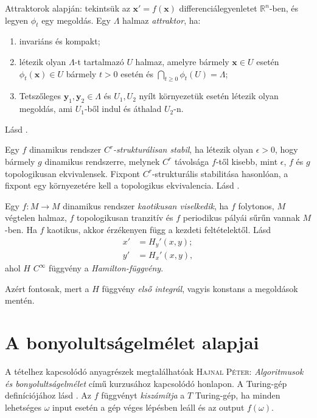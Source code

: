 \documentclass[%
	DIV=15,appendixprefix]{scrreprt}
\theoremstyle{definition}
\theoremstyle{remark}
\begin{document}
Attraktorok \cite[310.~oldal]{DE} alapján: tekintsük az $ \mathbf{ x }' = f \left( \mathbf{ x }
\right) $ differenciálegyenletet $ \mathbb{ R }^{ n } $-ben, és legyen $ \phi_{ t } $ egy megoldás.
Egy $ \Lambda $ halmaz \emph{attraktor}, ha:
\begin{enumerate}
	\item invariáns és kompakt;
	\item létezik olyan $ \Lambda$-t tartalmazó $U$ halmaz, amelyre bármely $ \mathbf{ x } \in
		U $ esetén $ \phi_{ t } \left( \mathbf{ x } \right) \in U $ bármely $ t > 0 $ esetén és
		$ \bigcap_{ t \ge 0 } \phi_{ t } \left( U \right) = \Lambda $;
	\item Tetszőleges $ \mathbf{ y }_{ 1 },{} \mathbf{ y }_{ 2 } \in \Lambda $ és $ U_{ 1 },{}
		U_{ 2 } $ nyílt környezetük esetén létezik olyan megoldás, ami $ U_{ 1 } $-ből indul és
		áthalad $ U_{ 2 } $-n.
\end{enumerate}
%
Lásd \cite[26.~oldal]{Makay}.

Egy $f$ dinamikus rendszer \emph{$C^r$-strukturálisan stabil}, ha létezik olyan $\epsilon >0$, hogy
bármely $g$ dinamikus rendszerre, melynek $C^r$ távolsága $f$-től kisebb, mint $\epsilon$, $f$ és
$g$ topologikusan ekvivalensek. Fixpont $C^r$-strukturális stabilitása hasonlóan, a fixpont egy
környezetére kell a topologikus ekvivalencia.
%
Lásd \cite[30.~oldal]{Makay}.

Egy $f \colon M \rightarrow M $ dinamikus rendszer \emph{kaotikusan viselkedik}, ha $f$ folytonos,
$M$ végtelen halmaz, $f$ topologikusan tranzitív és $f$ periodikus pályái sűrűn vannak $M$-ben. Ha
$f$ kaotikus, akkor érzékenyen függ a kezdeti feltételektől.
%
Lásd \cite[207.~oldal]{DE}
\begin{align*}
	x' &= H_{ y }'\left( x,{} y  \right);\\
	y' &= H_{ x }'\left( x,{} y  \right),
\end{align*}
ahol $H$ $C^\infty$ függvény a \emph{Hamilton-függvény}.

Azért fontosak, mert a $H$ függvény \emph{első integrál}, vagyis konstans a megoldások mentén.
\section{A bonyolultságelmélet alapjai}
A tételhez kapcsolódó anyagrészek megtalálhatóak \textsc{Hajnal Péter}: \emph{Algoritmusok és
bonyolultságelmélet} \cite{Bonya} című kurzusához kapcsolódó honlapon.
%
A Turing-gép definíciójához lásd
\cite[\href{http://www.math.u-szeged.hu/~hajnal/courses/MSc_Bonyolultsag/ea01.pdf}{
\emph{Kiszámíthatóság, Turing-gép, alapfogalmak}}]{Bonya}. Az $f$ függvényt \emph{kiszámítja} a $T$
Turing-gép, ha minden lehetséges $\omega$ input esetén a gép véges lépésben leáll és az output
$ f \left( \omega \right) $.
\end{document}

